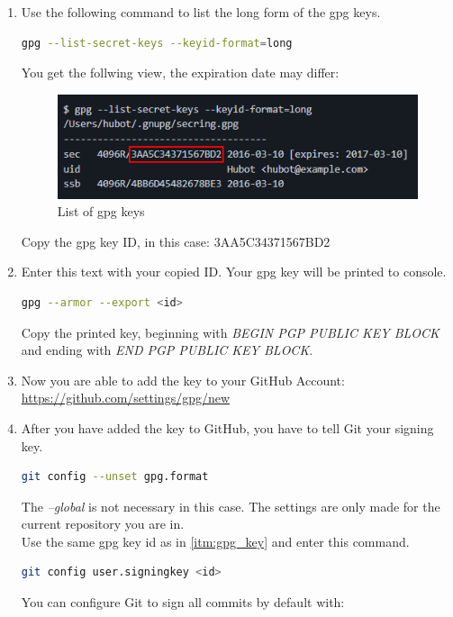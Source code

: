 \begin{enumerate}
        \item \label{itm:gpg_key} Use the following command to list the long form of the \ac{gpg} keys. 
            \begin{lstlisting}[language=bash] 
gpg --list-secret-keys --keyid-format=long 
            \end{lstlisting} 
        You get the follwing view, the expiration date may differ: 
        \begin{figure}[h]
            \centering
            \includegraphics{images/gpg_keys.png}
            \caption{List of \ac{gpg} keys}
            \label{fig:gpg_key}
        \end{figure}
        Copy the \ac{gpg} key ID, in this case: 3AA5C34371567BD2 
        \pagebreak
        \item Enter this text with your copied ID. Your \ac{gpg} key will be printed to console.
            \begin{lstlisting}[language=bash] 
gpg --armor --export <id>
            \end{lstlisting}
        Copy the printed key, beginning with \textit{BEGIN PGP PUBLIC KEY BLOCK} and ending with \textit{END PGP PUBLIC KEY BLOCK}.  
        \item Now you are able to add the key to your GitHub Account: \url{https://github.com/settings/gpg/new}
        \item After you have added the key to GitHub, you have to tell Git your signing key. 
            \begin{lstlisting}[language=bash] 
git config --unset gpg.format
            \end{lstlisting}   
        The \textit{--global} is not necessary in this case. The settings are only made for the current repository you are in. \\
        Use the same \ac{gpg} key id as  in \ref{itm:gpg_key} and enter this command. 
            \begin{lstlisting}[language=bash] 
git config user.signingkey <id>
            \end{lstlisting}   
        You can configure Git to sign all commits by default with:

\end{enumerate}

